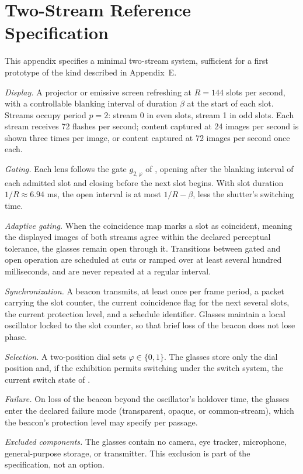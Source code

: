 \chapter{Two-Stream Reference Specification}\label{app:spec}

This appendix specifies a minimal two-stream system, sufficient for a first prototype of the kind described in Appendix~E.

\emph{Display.} A projector or emissive screen refreshing at $R=144$ slots per second, with a controllable blanking interval of duration $\beta$ at the start of each slot. Streams occupy period $p=2$: stream 0 in even slots, stream 1 in odd slots. Each stream receives 72 flashes per second; content captured at 24 images per second is shown three times per image, or content captured at 72 images per second once each.

\emph{Gating.} Each lens follows the gate $g_{2,\varphi}$ of , opening after the blanking interval of each admitted slot and closing before the next slot begins. With slot duration $1/R\approx 6.94$ ms, the open interval is at most $1/R-\beta$, less the shutter's switching time.

\emph{Adaptive gating.} When the coincidence map marks a slot as coincident, meaning the displayed images of both streams agree within the declared perceptual tolerance, the glasses remain open through it. Transitions between gated and open operation are scheduled at cuts or ramped over at least several hundred milliseconds, and are never repeated at a regular interval.

\emph{Synchronization.} A beacon transmits, at least once per frame period, a packet carrying the slot counter, the current coincidence flag for the next several slots, the current protection level, and a schedule identifier. Glasses maintain a local oscillator locked to the slot counter, so that brief loss of the beacon does not lose phase.

\emph{Selection.} A two-position dial sets $\varphi\in\{0,1\}$. The glasses store only the dial position and, if the exhibition permits switching under the switch system, the current switch state of .

\emph{Failure.} On loss of the beacon beyond the oscillator's holdover time, the glasses enter the declared failure mode (transparent, opaque, or common-stream), which the beacon's protection level may specify per passage.

\emph{Excluded components.} The glasses contain no camera, eye tracker, microphone, general-purpose storage, or transmitter. This exclusion is part of the specification, not an option.

